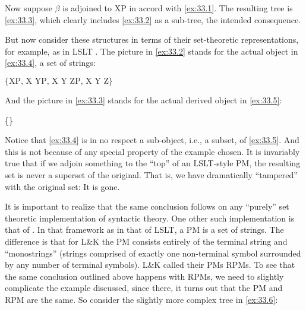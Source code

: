 \documentclass[output=paper]{langsci/langscibook}
\begin{document}
\begin{multicols}{2}
\ea\label{ex:33.2}
\ex\label{ex:33.3}
\z
\end{multicols}

Now suppose $\beta$ is adjoined to XP in accord with
\eqref{ex:33.1}. The resulting tree is \eqref{ex:33.3}, which clearly
includes \eqref{ex:33.2} as a sub-tree, the intended consequence.

But now consider these structures in terms of their set-theoretic
representations, for example, as in LSLT \parencite{Chomsky1955}. The picture
in \eqref{ex:33.2} stands for the actual object in \eqref{ex:33.4}, a
set of strings:\largerpage

\ea\label{ex:33.4}$\{\text{XP, X YP, X Y ZP, X Y Z}\}$
\z

\noindent And the picture in \eqref{ex:33.3} stands for the actual derived object in
\eqref{ex:33.5}:

\ea\label{ex:33.5}\{\}
\z

Notice that \eqref{ex:33.4} is in no respect a sub-object, i.e., a subset, of \eqref{ex:33.5}. And this
is not because of any special property of the example chosen. It is invariably
true that if we adjoin something to the \enquote{top} of an
LSLT-style \gls{PM}, the resulting set is never a superset
of the original. That is, we have dramatically \enquote{tampered} with the original
set: It is gone.

It is important to realize that the same conclusion follows on any \enquote{purely} set
theoretic implementation of syntactic theory. One other such implementation is
that of \citet{lk}. In that framework as in that of LSLT, a
\gls{PM} is a set of strings. The difference is that for L\&K the \gls{PM} consists
entirely of the terminal string and \enquote{monostrings} (strings comprised of exactly
one non-terminal symbol surrounded by any number of terminal symbols). L\&K
called their \glspl{PM} \glspl{RPM}. To see that the same conclusion outlined
above happens with \glspl{RPM}, we need to slightly complicate the example
discussed, since there, it turns out that the \gls{PM} and \gls{RPM} are the
same. So consider the slightly more complex tree in \eqref{ex:33.6}:
\end{document}

